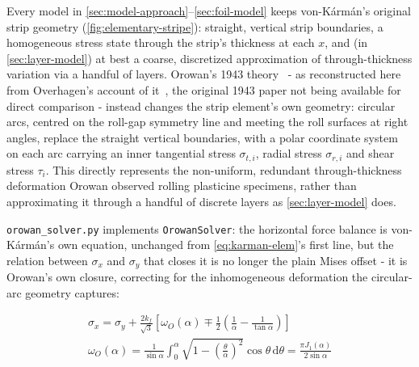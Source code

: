 \documentclass[11pt]{PyRollDocs}
\begin{document}
    Every model in \autoref{sec:model-approach}--\autoref{sec:foil-model} keeps von-Kármán's original strip geometry (\autoref{fig:elementary-stripe}): straight, vertical strip boundaries, a homogeneous stress state through the strip's thickness at each $x$, and (in \autoref{sec:layer-model}) at best a coarse, discretized approximation of through-thickness variation via a handful of layers. Orowan's 1943 theory~\cite{Orowan1943} - as reconstructed here from Overhagen's account of it~\cite[sec.~4.4.1.2]{Overhagen2018}, the original 1943 paper not being available for direct comparison - instead changes the strip element's own geometry: circular arcs, centred on the roll-gap symmetry line and meeting the roll surfaces at right angles, replace the straight vertical boundaries, with a polar coordinate system on each arc carrying an inner tangential stress $\sigma_{t,i}$, radial stress $\sigma_{r,i}$ and shear stress $\tau_i$. This directly represents the non-uniform, redundant through-thickness deformation Orowan observed rolling plasticine specimens, rather than approximating it through a handful of discrete layers as \autoref{sec:layer-model} does.

    \lstinline{orowan_solver.py} implements \lstinline{OrowanSolver}: the horizontal force balance is von-Kármán's own equation, unchanged from \autoref{eq:karman-elem}'s first line, but the relation between $\sigma_x$ and $\sigma_y$ that closes it is no longer the plain Mises offset - it is Orowan's own closure, correcting for the inhomogeneous deformation the circular-arc geometry captures:

    \begin{gather}
        \sigma_x = \sigma_y + \frac{2 k_f}{\sqrt3}\left[\omega_O(\alpha) \mp \frac12\left(\frac1\alpha - \frac1{\tan\alpha}\right)\right]
        \label{eq:orowan-closure}\\
        \omega_O(\alpha) = \frac1{\sin\alpha}\int_0^\alpha \sqrt{1 - \left(\frac\theta\alpha\right)^2}\cos\theta\,\mathrm d\theta = \frac{\pi J_1(\alpha)}{2\sin\alpha}
        \label{eq:omega-orowan}
    \end{gather}
\end{document}
